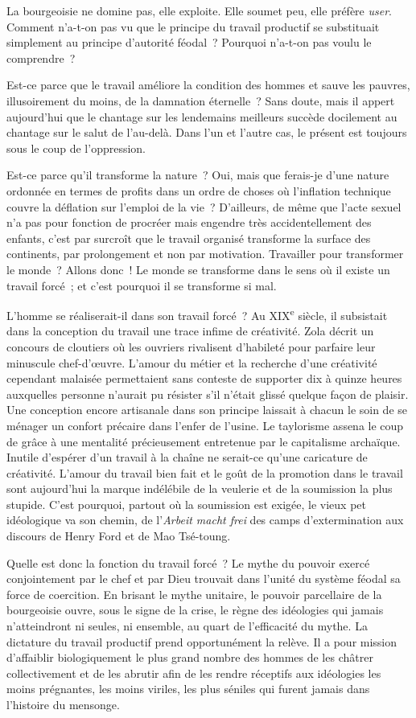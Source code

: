 \documentclass[french,twoside]{book} %
\begin{document}
La bourgeoisie ne domine pas, elle exploite. Elle soumet peu, elle préfère \emph{user}. Comment n’a-t-on pas vu que le principe du travail productif se substituait simplement au principe d’autorité féodal ? Pourquoi n’a-t-on pas voulu le comprendre ?\par
Est-ce parce que le travail améliore la condition des hommes et sauve les pauvres, illusoirement du moins, de la damnation éternelle ? Sans doute, mais il appert aujourd’hui que le chantage sur les lendemains meilleurs succède docilement au chantage sur le salut de l’au-delà. Dans l’un et l’autre cas, le présent est toujours sous le coup de l’oppression.\par
Est-ce parce qu’il transforme la nature ? Oui, mais que ferais-je d’une nature ordonnée en termes de profits dans un ordre de choses où l’inflation technique couvre la déflation sur l’emploi de la vie ? D’ailleurs, de même que l’acte sexuel n’a pas pour fonction de procréer mais engendre très accidentellement des enfants, c’est par surcroît que le travail organisé transforme la surface des continents, par prolongement et non par motivation. Travailler pour transformer le monde ? Allons donc ! Le monde se transforme dans le sens où il existe un travail forcé ; et c’est pourquoi il se transforme si mal.\par
L’homme se réaliserait-il dans son travail forcé ? Au XIX\textsuperscript{e} siècle, il subsistait dans la conception du travail une trace infime de créativité. Zola décrit un concours de cloutiers où les ouvriers rivalisent d’habileté pour parfaire leur minuscule chef-d’œuvre. L’amour du métier et la recherche d’une créativité cependant malaisée permettaient sans conteste de supporter dix à quinze heures auxquelles personne n’aurait pu résister s’il n’était glissé quelque façon de plaisir. Une conception encore artisanale dans son principe laissait à chacun le soin de se ménager un confort précaire dans l’enfer de l’usine. Le taylorisme assena le coup de grâce à une mentalité précieusement entretenue par le capitalisme archaïque. Inutile d’espérer d’un travail à la chaîne ne serait-ce qu’une caricature de créativité. L’amour du travail bien fait et le goût de la promotion dans le travail sont aujourd’hui la marque indélébile de la veulerie et de la soumission la plus stupide. C’est pourquoi, partout où la soumission est exigée, le vieux pet idéologique va son chemin, de l’\emph{Arbeit macht frei} des camps d’extermination aux discours de Henry Ford et de Mao Tsé-toung.\par
Quelle est donc la fonction du travail forcé ? Le mythe du pouvoir exercé conjointement par le chef et par Dieu trouvait dans l’unité du système féodal sa force de coercition. En brisant le mythe unitaire, le pouvoir parcellaire de la bourgeoisie ouvre, sous le signe de la crise, le règne des idéologies qui jamais n’atteindront ni seules, ni ensemble, au quart de l’efficacité du mythe. La dictature du travail productif prend opportunément la relève. Il a pour mission d’affaiblir biologiquement le plus grand nombre des hommes de les châtrer collectivement et de les abrutir afin de les rendre réceptifs aux idéologies les moins prégnantes, les moins viriles, les plus séniles qui furent jamais dans l’histoire du mensonge.\par
\end{document}

